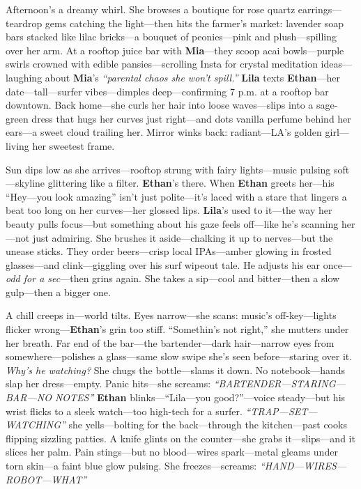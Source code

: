 \documentclass{article}
\begin{document}
Afternoon’s a dreamy whirl. She browses a boutique for rose quartz earrings—teardrop gems catching the light—then hits the farmer’s market: lavender soap bars stacked like lilac bricks—a bouquet of peonies—pink and plush—spilling over her arm. At a rooftop juice bar with \textbf{Mia}—they scoop acai bowls—purple swirls crowned with edible pansies—scrolling Insta for crystal meditation ideas—laughing about \textbf{Mia}’s \textit{“parental chaos she won’t spill.”} \textbf{Lila} texts \textbf{Ethan}—her date—tall—surfer vibes—dimples deep—confirming 7 p.m. at a rooftop bar downtown. Back home—she curls her hair into loose waves—slips into a sage-green dress that hugs her curves just right—and dots vanilla perfume behind her ears—a sweet cloud trailing her. Mirror winks back: radiant—LA’s golden girl—living her sweetest frame.

Sun dips low as she arrives—rooftop strung with fairy lights—music pulsing soft—skyline glittering like a filter. \textbf{Ethan}’s there. When \textbf{Ethan} greets her—his “Hey—you look amazing” isn’t just polite—it’s laced with a stare that lingers a beat too long on her curves—her glossed lips. \textbf{Lila}’s used to it—the way her beauty pulls focus—but something about his gaze feels off—like he’s scanning her—not just admiring. She brushes it aside—chalking it up to nerves—but the unease sticks. They order beers—crisp local IPAs—amber glowing in frosted glasses—and clink—giggling over his surf wipeout tale. He adjusts his ear once—\textit{odd for a sec}—then grins again. She takes a sip—cool and bitter—then a slow gulp—then a bigger one.

A chill creeps in—world tilts. Eyes narrow—she scans: music’s off-key—lights flicker wrong—\textbf{Ethan}’s grin too stiff. “Somethin’s not right,” she mutters under her breath. Far end of the bar—the bartender—dark hair—narrow eyes from somewhere—polishes a glass—same slow swipe she’s seen before—staring over it. \textit{Why’s he watching?} She chugs the bottle—slams it down. No notebook—hands slap her dress—empty. Panic hits—she screams: \textit{“BARTENDER—STARING—BAR—NO NOTES”} \textbf{Ethan} blinks—“Lila—you good?”—voice steady—but his wrist flicks to a sleek watch—too high-tech for a surfer. \textit{“TRAP—SET—WATCHING”} she yells—bolting for the back—through the kitchen—past cooks flipping sizzling patties. A knife glints on the counter—she grabs it—slips—and it slices her palm. Pain stings—but no blood—wires spark—metal gleams under torn skin—a faint blue glow pulsing. She freezes—screams: \textit{“HAND—WIRES—ROBOT—WHAT”}
\end{document}
